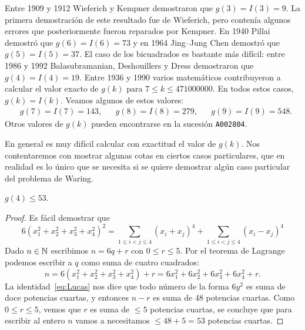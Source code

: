 Entre 1909 y 1912 Wieferich y Kempner demostraron que $g(3)=I(3)=9$.  La
primera demostración de este resultado fue de Wieferich, pero contenía algunos
errores que posteriormente fueron reparados por Kempner. En 1940 Pillai
demostró que $g(6)=I(6)=73$ y en 1964 Jing--Jung Chen demostró que
$g(5)=I(5)=37$.  El caso de los bicuadrados es bastante más difícil: entre 1986
y 1992 Balasubramanian, Deshouillers y Dress demostraron que $g(4)=I(4)=19$.
Entre 1936 y 1990 varios matemáticos contribuyeron a calcular el valor exacto
de $g(k)$ para $7\leq k\leq 471000000$. En todos estos casos, $g(k)=I(k)$.
Veamos algunos de estos valores:
\begin{align*}
	&g(7)=I(7)=143,
	&&g(8)=I(8)=279,
	&&g(9)=I(9)=548.
\end{align*}
Otros valores de $g(k)$ pueden encontrarse en la sucesión \verb+A002804+.
%
%

En general es muy difícil calcular con exactitud el valor de $g(k)$. Nos
contentaremos con mostrar algunas cotas en ciertos casos particulares, que en
realidad es lo único que se necesita si se quiere demostrar algún caso
particular del problema de Waring.

\begin{theorem}[Liouville]
	$g(4)\leq 53$.
\end{theorem}

\begin{proof}
	Es fácil demostrar que
	\begin{equation}
		\label{eq:Lucas}
		6(x_1^2+x_2^2+x_3^2+x_4^2)^2=\sum_{1\leq i<j\leq 4}(x_i+x_j)^4+\sum_{1\leq i<j\leq 4}(x_i-x_j)^4
	\end{equation}
	Dado $n\in\mathbb{N}$ escribimos $n=6q+r$ con $0\leq r\leq 5$. Por el teorema de Lagrange podemos
	escribir a $q$ como suma de cuatro cuadrados:
	\[
		n=6(x_1^2+x_2^2+x_3^2+x_4^2)+r=6x_1^2+6x_2^2+6x_3^2+6x_4^2+r.
	\]
	La identidad~\eqref{eq:Lucas} nos dice que todo número de la forma $6y^2$
	es suma de doce potencias cuartas, y entonces $n-r$ es suma de 48 potencias
	cuartas. Como $0\leq r\leq 5$, vemos que $r$ es suma de $\leq 5$ potencias
	cuartas, se concluye que para escribir al entero $n$ vamos a necesitamos
	$\leq 48+5=53$ potencias cuartas.
\end{proof}

